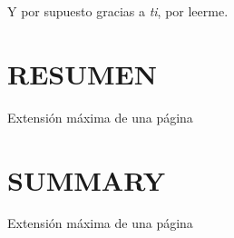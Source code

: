 \documentclass[spanish,12pt, a4paper,twoside]{article}
\let\oldsection\section
\def\section{\cleardoublepage\oldsection}
\newcommand\blankpage{
    \null
    \thispagestyle{empty}
    \addtocounter{page}{-1}
    \newpage
}
\begin{document}
    Y por supuesto gracias a \textit{ti}, por leerme.

    \section*{RESUMEN}
    Extensión máxima de una página %


    \section*{SUMMARY}
    Extensión máxima de una página


    \tableofcontents %



    \listoffigures

    \listoftables
    
    \listofalgorithms
	\afterpage{\blankpage}
	
    \newpage
	

    
    \newpage

    
    \newpage

   	
   	\newpage

    
    \newpage
    
    
    \newpage
    
    
    \newpage
    

	\begin{appendices}
	\graphicspath{{anexos/recursos/}}
	
    
	\newpage

 	
	\newpage
	
 	
	\newpage
	
 	
	\newpage
	
 	
	\newpage
	
 	
	\newpage

	\end{appendices}

    \newpage

    \normalem
    
    
\end{document}
